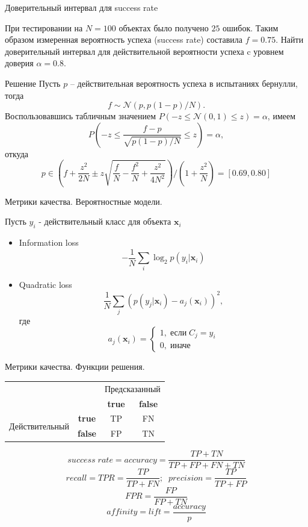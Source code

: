 \documentclass[10pt]{beamer}
\begin{document}
\begin{frame}{Доверительный интервал для success rate}

При тестировании на $N=100$ объектах было получено $25$ ошибок. Таким образом измеренная вероятность успеха (success rate) составила $f=0.75$. Найти доверительный интервал для действительной вероятности успеха c уровнем доверия $\alpha=0.8$. 

\begin{exampleblock}{Решение}
Пусть $p$ -- действительная вероятность успеха в испытаниях бернулли, тогда
\[
f \sim \mathcal{N}\left( p, p(1-p)/N \right).
\]
Воспользовавшись табличным значением $P(-z \leq \mathcal{N}(0,1) \leq z) = \alpha$, имеем
\[
P\left(-z \leq \frac{f-p}{\sqrt{p(1-p)/N}} \leq z \right) = \alpha,
\]
откуда
\[
p \in \left(f + \frac{z^2}{2N} \pm z \sqrt{\frac f N - \frac{f^2}{N}+\frac{z^2}{4N^2}} \right)/\left(1 + \frac {z^2}{N} \right) = [0.69, 0.80]
\]
\end{exampleblock}
  
\end{frame}

\begin{frame}{Метрики качества. Вероятностные модели.}

Пусть $y_i$ - действительный класс для объекта $\mathbf{x}_i$
\begin{itemize}
\item  Information loss 
\[
- \frac 1 N \sum_i \log_2 p(y_i | \mathbf{x}_i)
\]
\item Quadratic loss 
\[
\frac 1 N \sum_j (p(y_j | \mathbf{x}_i) - a_j(\mathbf{x}_i))^2,
\] 
где
\[
a_j(\mathbf{x}_i) = \begin{cases}
1, \;\text{если}\;C_j = y_i\\
0, \;\text{иначе}
\end{cases} 
\]
\end{itemize}

\end{frame}

\begin{frame}{Метрики качества. Функции решения.}

\begin{center}
\begin{tabular}{|c r | c c|}
\cline{3-4}
 \multicolumn{2}{c|}{} & \multicolumn{2}{c|}{Предсказанный} \\
 \cline{3-4}
 \multicolumn{2}{c|}{} & {\bf true} & {\bf false} \\
 \hline
 \multirow{2}{*}{Действительный} & \multicolumn{1}{|c|}{\bf true} & TP & FN \\
 & \multicolumn{1}{|c|}{\bf false}  & FP & TN \\
 \hline
\end{tabular}
\end{center}

\[
success\;rate = accuracy = \frac{TP + TN}{TP + FP + FN + TN}
\]
\[
recall = TPR = \frac{TP}{TP + FN};\;\;precision = \frac{TP}{TP + FP}
\]
\[
FPR = \frac{FP}{FP + TN}
\]
\[
affinity = lift = \frac{accuracy}{p}
\]

\end{frame}
\end{document}

